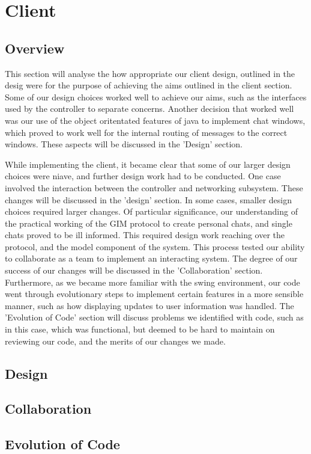 \section{Client}

\subsection{Overview}

This section will analyse the how appropriate our client design, outlined in the desig were for the purpose of achieving the aims outlined in the client section. Some of our design choices worked well to achieve our aims, such as the interfaces used by the controller to separate concerns. Another decision that worked well was our use of the object oritentated features of java to implement chat windows, which proved to work well for the internal routing of messages to the correct windows. These aspects will be discussed in the 'Design' section.

While implementing the client, it became clear that some of our larger design choices were niave, and further design work had to be conducted. One case involved the interaction between the controller and networking subsystem. These changes will be discussed in the 'design' section. In some cases, smaller design choices required larger changes. Of particular significance, our understanding of the practical working of the GIM protocol to create personal chats, and single chats proved to be ill informed. This required design work reaching over the protocol, and the model component of the system. This process tested our ability to collaborate as a team to implement an interacting system. The degree of our success of our changes will be discussed in the 'Collaboration' section. Furthermore, as we became more familiar with the swing environment, our code went through evolutionary steps to implement certain features in a more sensible manner, such as how displaying updates to user information was handled. The 'Evolution of Code' section will discuss problems we identified with code, such as in this case, which was functional, but deemed to be hard to maintain on reviewing our code, and the merits of our changes we made. 

\subsection{Design}

\subsection{Collaboration}

\subsection{Evolution of Code}
